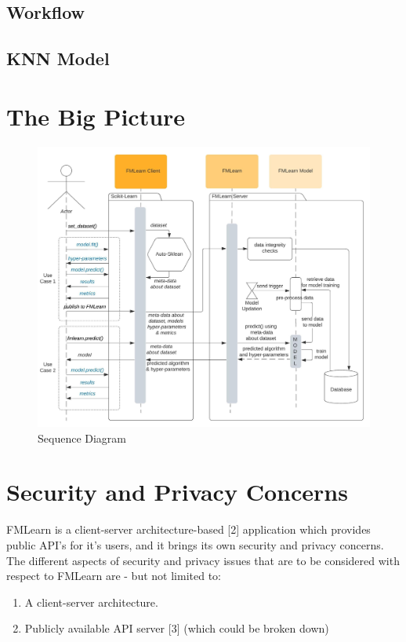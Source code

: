 \subsection{Workflow}

\subsection{KNN Model}
\label{knn-model}

\section{The Big Picture}



\begin{figure}[H]
    \centering
    \includegraphics[width=15cm]{images/Sequence Diagram.jpeg}
    \caption{Sequence Diagram}
    \label{sequence-diagram}
\end{figure}


\section{Security and Privacy Concerns}
FMLearn is a client-server architecture-based [2] application which provides public API’s for it's users, and it brings its own security and privacy concerns. The different aspects of security and privacy issues that are to be considered with respect to FMLearn are - but not limited to:

\begin{enumerate}
    \item A client-server architecture.
    \item Publicly available API server [3] (which could be broken down)
\end{enumerate}

